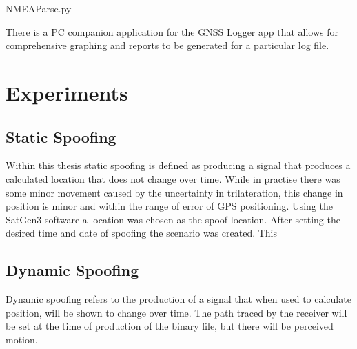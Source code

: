 
\begin{lstinputlisting}[language=Python, label=list:pythonHaversines, caption=Python implementation of the law of Haversines used to calculate the distance between two points on a sphere, firstline=23, lastline=29]{NMEAParse.py}
\end{lstinputlisting}

There is a PC companion application for the GNSS Logger app that allows for comprehensive
graphing and reports to be generated for a particular log file.


\section{Experiments}
\subsection{Static Spoofing}
Within this thesis static spoofing is defined as producing a signal that produces a calculated location that does not change over time. While in practise there was some
minor movement caused by the uncertainty in trilateration, this change in position is minor and within the range of error of GPS positioning.
Using the SatGen3 software a location was chosen as the spoof location. After setting the desired time and date of spoofing the scenario was created. This 

\subsection{Dynamic Spoofing}
Dynamic spoofing refers to the production of a signal that when used to calculate position, will be shown to change over time. The path traced by the receiver will be
set at the time of production of the binary file, but there will be perceived motion.

